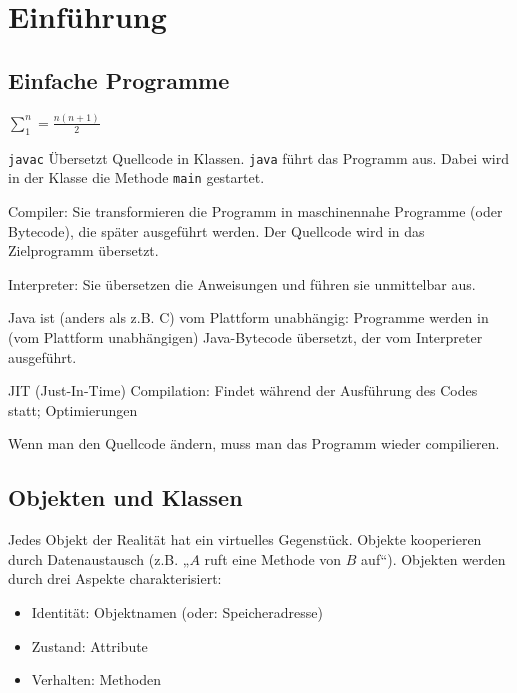 \chapter{Einführung}

\section{Einfache Programme}

\begin{example}
  \( \sum_1^n = \frac{n(n+1)}{2} \)
  
\end{example}

\texttt{javac} Übersetzt Quellcode in Klassen. \texttt{java} führt das Programm aus. Dabei wird in der Klasse die Methode \texttt{main} gestartet.

Compiler: Sie transformieren die Programm in maschinennahe Programme (oder Bytecode), die später ausgeführt werden. Der Quellcode wird in das Zielprogramm übersetzt.

Interpreter: Sie übersetzen die Anweisungen und führen sie unmittelbar aus.

Java ist (anders als z.B. C) vom Plattform unabhängig: Programme werden in (vom Plattform unabhängigen) Java-Bytecode übersetzt, der vom Interpreter ausgeführt.

JIT (Just-In-Time) Compilation: Findet während der Ausführung des Codes statt; Optimierungen

Wenn man den Quellcode ändern, muss man das Programm wieder compilieren.

\section{Objekten und Klassen}

Jedes Objekt der Realität hat ein virtuelles Gegenstück. Objekte kooperieren durch Datenaustausch (z.B. „$A$ ruft eine Methode von $B$ auf“). Objekten werden durch drei Aspekte charakterisiert:
\begin{itemize}
\item Identität: Objektnamen (oder: Speicheradresse)
\item Zustand: Attribute
\item Verhalten: Methoden
\end{itemize}

